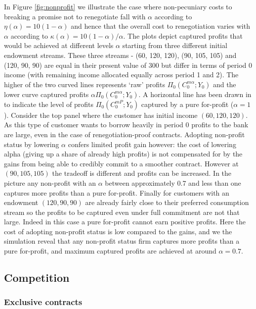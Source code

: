 \documentclass[11pt,english]{article}
\theoremstyle{plain}
\theoremstyle{definition}
\begin{document}
In Figure \ref{fig:nonprofit} we illustrate the case where
non-pecuniary costs to breaking a promise not to renegotiate fall
with $\alpha$ according to $\eta(\alpha)=10(1-\alpha)$ and hence
that the overall cost to renegotiation varies with $\alpha$ according
to $\kappa(\alpha)=10(1-\alpha)/\alpha$. The plots depict captured
profits that would be achieved at different levels $\alpha$ starting
from three different initial endowment streams. These three streams
- (60, 120, 120), (90, 105, 105) and (120, 90, 90) \textendash{} are
equal in their present value of 300 but differ in terms of period
0 income (with remaining income allocated equally across period 1
and 2). The higher of the two curved lines represents `raw' profits
$\Pi_{0}(C_{0}^{m\alpha};Y_{0})$ and the lower curve captured profits
$\alpha\Pi_{0}(C_{0}^{m\alpha};Y_{0})$. A horizontal line has been
drawn in to indicate the level of profits $\Pi_{0}(C_{0}^{mP};Y_{0})$
captured by a pure for-profit ($\alpha=1$). Consider the top panel
where the customer has initial income $(60,120,120)$. As this type
of customer wants to borrow heavily in period 0 profits to the bank
are large, even in the case of renegotiation-proof contracts. Adopting
non-profit status by lowering $\alpha$ confers limited profit gain
however: the cost of lowering alpha (giving up a share of already
high profits) is not compensated for by the gains from being able
to credibly commit to a smoother contract. However at $(90,105,105)$
the tradeoff is different and profits can be increased. In the picture
any non-profit with an $\alpha$ between approximately 0.7 and less
than one captures more profits than a pure for-profit. Finally for
customers with an endowment $(120,90,90)$ are already fairly close
to their preferred consumption stream so the profits to be captured
even under full commitment are not that large. Indeed in this case
a pure for-profit cannot earn positive profits. Here the cost of adopting
non-profit status is low compared to the gains, and we the simulation
reveal that any non-profit status firm captures more profits than
a pure for-profit, and maximum captured profits are achieved at around
$\alpha=0.7$.

\subsection{Competition}

\subsubsection{Exclusive contracts}
\end{document}
